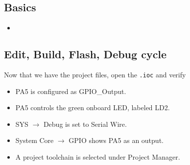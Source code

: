 \documentclass{report}
\begin{document}
    \bigbreak \noindent 
    \subsection{Basics}
    \begin{itemize}
        \item \textbf{}        


    \end{itemize}

    \bigbreak \noindent 
    \subsection{Edit, Build, Flash, Debug cycle}
    \bigbreak \noindent 
    Now that we have the project files, open the \texttt{.ioc} and verify
    \begin{itemize}
        \item PA5 is configured as GPIO\_Output.
        \item PA5 controls the green onboard LED, labeled LD2.
        \item SYS $\to$ Debug is set to Serial Wire.
        \item System Core $\to$ GPIO shows PA5 as an output.
        \item A project toolchain is selected under Project Manager.
    \end{itemize}
\end{document}
